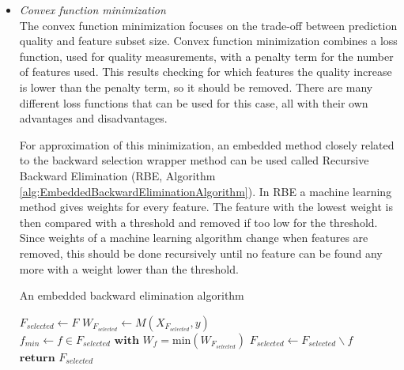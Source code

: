 \documentclass[10pt,a4paper]{article}
\begin{document}
\begin{itemize}
		\item \textit{Convex function minimization} \\
		
		The convex function minimization focuses on the trade-off between prediction quality and feature subset size. Convex function minimization combines a loss function, used for quality measurements, with a penalty term for the number of features used. This results checking for which features the quality increase is lower than the penalty term, so it should be removed. There are many different loss functions that can be used for this case, all with their own advantages and disadvantages\cite{Lal2006}.
		
		For approximation of this minimization, an embedded method closely related to the backward selection wrapper method can be used called Recursive Backward Elimination (RBE, Algorithm \ref{alg:EmbeddedBackwardEliminationAlgorithm}). In RBE a machine learning method gives weights for every feature. The feature with the lowest weight is then compared with a threshold and removed if too low for the threshold. Since weights of a machine learning algorithm change when features are removed, this should be done recursively until no feature can be found any more with a weight lower than the threshold\cite{Lal2006}.
		
		\begin{algorithm}[H]
			\caption{An embedded backward elimination algorithm\cite{Lal2006} }\label{alg:EmbeddedBackwardEliminationAlgorithm}
			\begin{algorithmic}[1]
				\State $F_{\textit{selected}} \gets F$ 	
				 
				\State $W_{F_{\textit{selected}}} \gets M(X_{F_{\textit{selected}}}, y)$
				\State $f_{\textit{min}} \gets f \in F_{\textit{selected}} \textbf{ with } W_f = \text{min}(W_{F_{\textit{selected}}})$ 
					
				\State $F_{\textit{selected}} \gets F_{\textit{selected}} \backslash f$ 					
				\EndIf
				\EndWhile
				\State $\textbf{return } F_{\textit{selected}}$
				\EndProcedure
			\end{algorithmic}
		\end{algorithm}
			
	\end{itemize}
\end{document}
